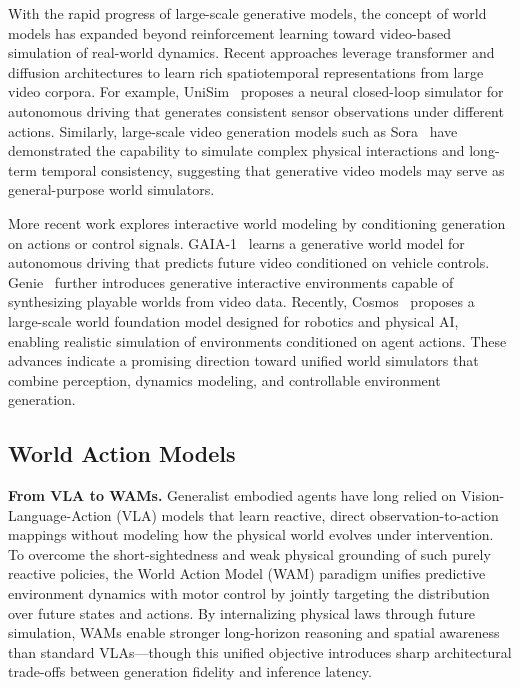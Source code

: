 \documentclass{llmxive}
\begin{document}
With the rapid progress of large-scale generative models, the concept of world models has expanded beyond reinforcement learning toward video-based simulation of real-world dynamics. Recent approaches leverage transformer and diffusion architectures to learn rich spatiotemporal representations from large video corpora. For example, UniSim~\cite{yang2023unisim} proposes a neural closed-loop simulator for autonomous driving that generates consistent sensor observations under different actions. Similarly, large-scale video generation models such as Sora~\cite{brooks2024video} have demonstrated the capability to simulate complex physical interactions and long-term temporal consistency, suggesting that generative video models may serve as general-purpose world simulators.

More recent work explores interactive world modeling by conditioning generation on actions \cite{wu2026multiworld} or control signals. GAIA-1~\cite{hu2023gaia} learns a generative world model for autonomous driving that predicts future video conditioned on vehicle controls. Genie~\cite{bruce2024genie} further introduces generative interactive environments capable of synthesizing playable worlds from video data. Recently, Cosmos~\cite{nvidia2025worldsimulationvideofoundation} proposes a large-scale world foundation model designed for robotics and physical AI, enabling realistic simulation of environments conditioned on agent actions. These advances indicate a promising direction toward unified world simulators that combine perception, dynamics modeling, and controllable environment generation.

\subsection{World Action Models}

\textbf{From VLA to WAMs.}
Generalist embodied agents have long relied on Vision-Language-Action (VLA) models that learn reactive, direct observation-to-action mappings without modeling how the physical world evolves under intervention. To overcome the short-sightedness and weak physical grounding of such purely reactive policies, the World Action Model (WAM) paradigm unifies predictive environment dynamics with motor control by jointly targeting the distribution over future states and actions. By internalizing physical laws through future simulation, WAMs enable stronger long-horizon reasoning and spatial awareness than standard VLAs—though this unified objective introduces sharp architectural trade-offs between generation fidelity and inference latency.
\end{document}
